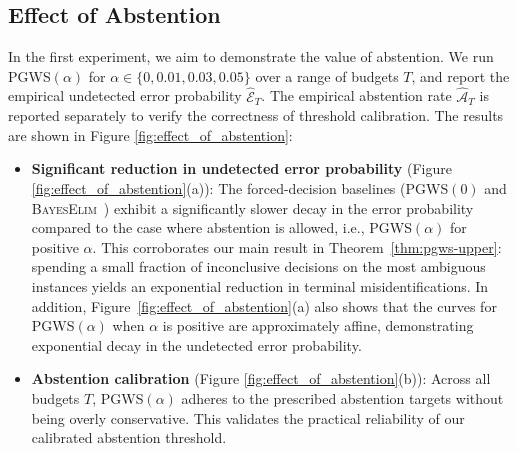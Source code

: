 \documentclass[10pt]{article}
\newcommand{\ouralg}{{\textnormal{\textsc{PGWS}}}}
\theoremstyle{plain}
\begin{document}
\subsection{Effect of Abstention}
\label{subsec:experiment-abstention-benefit}
 In the first experiment, we aim to demonstrate the value of  abstention. %
We run
\ouralg$(\alpha)$ for
$\alpha\in\{0,0.01,0.03,0.05\}$
over a range of budgets $T$, %
and report the empirical undetected error probability 
$\widehat{\mathcal E}_T$. %
The empirical abstention rate $\widehat{\mathcal A}_T$ is reported separately to verify the correctness of threshold calibration. 
The results are shown in Figure \ref{fig:effect_of_abstention}:
\begin{itemize}
    \item \textbf{Significant reduction in undetected error probability} (Figure \ref{fig:effect_of_abstention}(a)): The forced-decision baselines (\ouralg$(0)$ and \textsc{BayesElim}~\citep{atsidakou2023bayesian}) exhibit a significantly slower decay in the error probability compared to the case where abstention is allowed, i.e., \ouralg$(\alpha)$ for positive $\alpha$. 
    This corroborates  our main result in Theorem~\ref{thm:pgws-upper}: spending a small fraction of inconclusive decisions on the most ambiguous instances yields an exponential reduction in terminal misidentifications.  In addition,  Figure~\ref{fig:effect_of_abstention}(a) also shows that the curves for \ouralg{}$(\alpha)$ when  $\alpha$  is  positive are approximately affine, demonstrating exponential decay in the undetected error probability. 
    \item \textbf{Abstention calibration} (Figure \ref{fig:effect_of_abstention}(b)): Across all budgets $T$, \ouralg$(\alpha)$ adheres to the prescribed abstention targets without being overly conservative. This validates the practical reliability of our calibrated abstention threshold.
\end{itemize}
\end{document}

